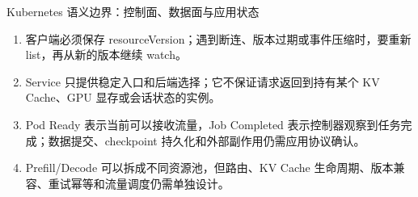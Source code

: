 \documentclass[UTF8,fontset=none,aspectratio=169,10pt]{beamer}
\begin{document}
\begin{frame}{Kubernetes 语义边界：控制面、数据面与应用状态}
\small
\begin{enumerate}
  \item {}客户端必须保存 resourceVersion；遇到断连、版本过期或事件压缩时，要重新 list，再从新的版本继续 watch。
  \item {}Service 只提供稳定入口和后端选择；它不保证请求返回到持有某个 KV Cache、GPU 显存或会话状态的实例。
  \item {}Pod Ready 表示当前可以接收流量，Job Completed 表示控制器观察到任务完成；数据提交、checkpoint 持久化和外部副作用仍需应用协议确认。
  \item {}Prefill/Decode 可以拆成不同资源池，但路由、KV Cache 生命周期、版本兼容、重试幂等和流量调度仍需单独设计。
\end{enumerate}
\vfill
{}
\end{frame}
\end{document}
